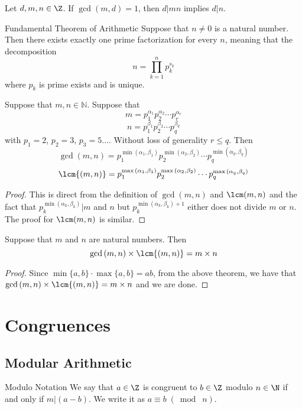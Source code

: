 \documentclass[a4paper]{article}
\begin{document}
\begin{prp}{}{} Let $d,m,n\in\Z$. If $\gcd(m,d)=1$, then $d|mn$ implies $d|n$. 
\end{prp}

\begin{thm}{Fundamental Theorem of Arithmetic}{} Suppose that $n\neq 0$ is a natural number. Then there exists exactly one prime factorization for every $n$, meaning that the decomposition $$n=\prod_{k=1}^np_k^{s_k}$$ where $p_k$ is prime exists and is unique. 
\end{thm}

\begin{thm}{}{} Suppose that $m,n\in\mathbb{N}$. Suppose that 
$$m=p_1^{\alpha_1}p_2^{\alpha_2}\cdots p_r^{\alpha_r}$$
$$n=p_1^{\beta_1}p_2^{\beta_2}\cdots p_q^{\beta_q}$$
with $p_1=2$, $p_2=3$, $p_3=5\dots$. Without loss of generality $r\leq q$. Then $$\gcd{(m,n)}=p_1^{\min{(\alpha_1,\beta_1)}}p_2^{\min{(\alpha_2,\beta_2)}}\cdots p_q^{\min{(\alpha_q,\beta_q)}}$$
$$\lcm{(m,n)}=p_1^{\max{(\alpha_1,\beta_1)}}p_2^{\max{(\alpha_2,\beta_2)}}\cdots p_q^{\max{(\alpha_q,\beta_q)}}$$ \tcbline
\begin{proof}
This is direct from the definition of $\gcd(m,n)$ and $\lcm(m,n)$ and the fact that $p_k^{\min(\alpha_k,\beta_k)}|m$ and $n$ but $p_k^{\min(\alpha_k,\beta_k)+1}$ either does not divide $m$ or $n$. The proof for $\lcm(m,n)$ is similar. 
\end{proof}
\end{thm}

\begin{thm}{}{} Suppose that $m$ and $n$ are natural numbers. Then $$\gcd{(m,n)}\times\lcm{(m,n)}=m\times n$$ \tcbline
\begin{proof} Since $\min\{a,b\}\cdot\max\{a,b\}=ab$, from the above theorem, we have that $\gcd{(m,n)}\times\lcm{(m,n)}=m\times n$ and we are done. 
\end{proof}
\end{thm}

\pagebreak
\section{Congruences}
\subsection{Modular Arithmetic}
\begin{defn}{Modulo Notation}{} We say that $a\in\Z$ is congruent to $b\in\Z$ modulo $n\in\N$ if and only if $m|(a-b)$. We write it as $a\equiv b\;(\bmod\;n)$. 
\end{defn}
\end{document}
